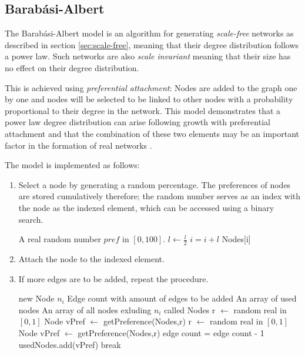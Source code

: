 \documentclass[a4paper,11pt,titlepage]{article}
\begin{document}
\subsection{Barab\'{a}si-Albert}

The Barab\'{a}si-Albert model is an algorithm for generating \emph{scale-free}
networks as described in section \ref{sec:scale-free}, meaning that
their degree distribution follows a power law. Such networks are also
\emph{scale invariant} meaning that their size has no effect on their
degree distribution.

This is achieved using \emph{preferential attachment}: Nodes are added to
the graph one by one and nodes will be selected to be linked to other nodes with
a probability proportional to their degree in the network. This model
demonstrates that a power law degree distribution can arise following growth
with preferential attachment and that the combination of these two elements
may be an important factor in the formation of real networks \cite{oconn11}.

The model is implemented as follows:


\begin{enumerate}
\item
  Select a node by generating a random percentage. The preferences of nodes are
  stored cumulatively therefore; the random number serves as an index with the
  node as the indexed element, which can be accessed using a binary search.
  \begin{algorithmic}
    \REQUIRE A real random number $pref$ in $[0,100]$.
        \STATE $l \gets \frac{l}{2}$
            \STATE $i = i+l$
          \ENDIF
        \ENDIF
      \ENDFOR
    \ENDFOR
    \RETURN Nodes[i]
  \end{algorithmic}

  \item Attach the node to the indexed element.

  \item If more edges are to be added, repeat the procedure.
  \begin{algorithmic}
    \REQUIRE new Node $n_i$
    \REQUIRE Edge count with amount of edges to be added
    \REQUIRE An array of used nodes
    \REQUIRE An array of all nodes exluding $n_i$ called Nodes
      \STATE r $\gets$ random real in $[0, 1]$
      \STATE Node vPref $\gets$ getPreference(Nodes,r)
        \STATE r $\gets$ random real in $[0, 1]$
        \STATE Node vPref $\gets$ getPreference(Nodes,r)
      \ENDWHILE
      \STATE edge count = edge count - 1
      \STATE usedNodes.add(vPref)
        \STATE break
      \ENDIF
    \ENDWHILE
  \end{algorithmic}
\end{enumerate}
\end{document}
